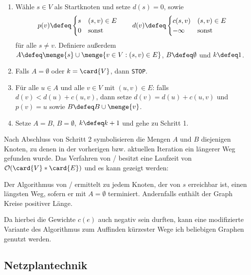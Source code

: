 \begin{enumerate}[label=Schritt \arabic*:, leftmargin=*, start=0]
	\item Wähle $s \in V$ als Startknoten und setze $d(s) = 0$, sowie
	\begin{equation*}
		p(v) \defeq \begin{cases}
		s & (s,v) \in E \\ 0 & \text{sonst}
		\end{cases} 
		\qquad
		d(v) \defeq \begin{cases}
		c(s,v) & (s,v) \in E \\ -\infty &\text{sonst}
		\end{cases}
	\end{equation*}
	für alle $s \neq v$. Definiere außerdem $A \defeq \menge{s} \cup \menge{v \in V: (s,v) \in E}$, $B \defeq \emptyset$ und $k \defeq 1$.
	\item Falls $A = \emptyset$ oder $k = \card{V}$, dann \texttt{STOP}.
	\item Für alle $u \in A$ und alle $v \in V$ mit $(u,v) \in E$: falls $d(v) < d(u) + c(u,v)$, dann setze $d(v) = d(u) + c(u,v)$ und $p(v) = u$ sowie $B \defeq B \cup \menge{v}$.
	\item Setze $A = B$, $B = \emptyset$, $k \defeq k+1$ und gehe zu Schritt 1.
\end{enumerate}

Nach Abschluss von Schritt 2 symbolisieren die Mengen $A$ und $B$ diejenigen Knoten, zu denen in der vorherigen bzw. aktuellen Iteration ein längerer Weg gefunden wurde. Das Verfahren von / besitzt eine Laufzeit von $\mathcal{O}(\card{V} * \card{E})$ und es kann gezeigt werden:

\begin{aussage}
	Der Algorithmus von / ermittelt zu jedem Knoten, der von $s$ erreichbar ist, einen längsten Weg, sofern er mit $A = \emptyset$ terminiert. Andernfalls enthält der Graph Kreise positiver Länge.
\end{aussage}


Da hierbei die Gewichte $c(e)$ auch negativ sein durften, kann eine modifizierte Variante des Algorithmus zum Auffinden kürzester Wege ich beliebigen Graphen genutzt werden.

\subsection{Netzplantechnik}

